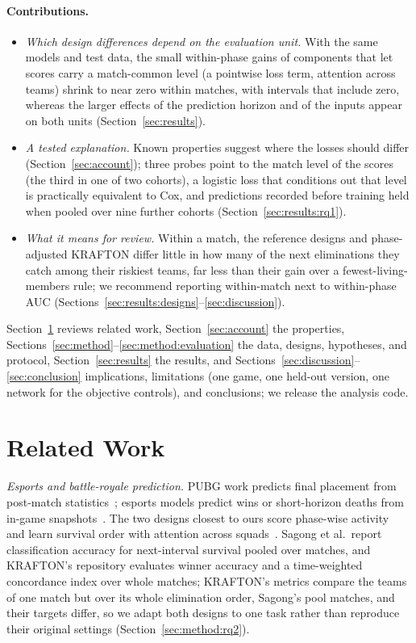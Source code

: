 \documentclass[sigconf,anonymous]{acmart}
\begin{document}
\paragraph{Contributions.}
\begin{itemize}
\item \emph{Which design differences depend on the evaluation unit.} With the same models and test data, the small within-phase gains of components that let scores carry a match-common level (a pointwise loss term, attention across teams) shrink to near zero within matches, with intervals that include zero, whereas the larger effects of the prediction horizon and of the inputs appear on both units (Section~\ref{sec:results}).
\item \emph{A tested explanation.} Known properties suggest where the losses should differ (Section~\ref{sec:account}); three probes point to the match level of the scores (the third in one of two cohorts), a logistic loss that conditions out that level is practically equivalent to Cox, and predictions recorded before training held when pooled over nine further cohorts (Section~\ref{sec:results:rq1}).
\item \emph{What it means for review.} Within a match, the reference designs and phase-adjusted KRAFTON differ little in how many of the next eliminations they catch among their riskiest teams, far less than their gain over a fewest-living-members rule; we recommend reporting within-match next to within-phase AUC (Sections~\ref{sec:results:designs}--\ref{sec:discussion}).
\end{itemize}
Section~\ref{sec:related} reviews related work, Section~\ref{sec:account} the properties, Sections~\ref{sec:method}--\ref{sec:method:evaluation} the data, designs, hypotheses, and protocol, Section~\ref{sec:results} the results, and Sections~\ref{sec:discussion}--\ref{sec:conclusion} implications, limitations (one game, one held-out version, one network for the objective controls), and conclusions; we release the analysis code.

\section{Related Work}
\label{sec:related}
\emph{Esports and battle-royale prediction.} PUBG work predicts final placement from post-match statistics~\cite{KagglePUBG,LeeLee25}; esports models predict wins or short-horizon deaths from in-game snapshots~\cite{Hodge21,Katona19,Marshall22}. The two designs closest to ours score phase-wise activity~\cite{Sagong25a} and learn survival order with attention across squads~\cite{KRAFTON}. Sagong et al.\ report classification accuracy for next-interval survival pooled over matches, and KRAFTON's repository evaluates winner accuracy and a time-weighted concordance index over whole matches; KRAFTON's metrics compare the teams of one match but over its whole elimination order, Sagong's pool matches, and their targets differ, so we adapt both designs to one task rather than reproduce their original settings (Section~\ref{sec:method:rq2}).
\end{document}
